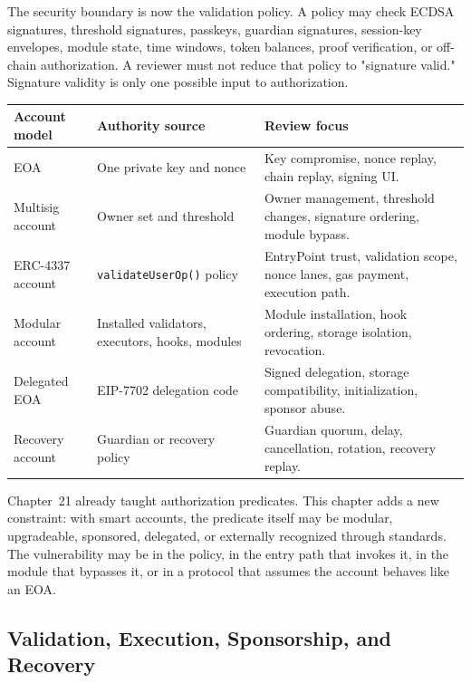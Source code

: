 The security boundary is now the validation policy. A policy may check ECDSA signatures, threshold signatures, passkeys, guardian signatures, session-key envelopes, module state, time windows, token balances, proof verification, or off-chain authorization. A reviewer must not reduce that policy to "signature valid." Signature validity is only one possible input to authorization.

\begin{table}[htbp]
\centering
\small
\renewcommand{\arraystretch}{1.14}
\begin{tabularx}{\textwidth}{@{}>{\RaggedRight\arraybackslash}p{}>{\RaggedRight\arraybackslash}p{}X@{}}
\toprule
Account model & Authority source & Review focus \\
\midrule
EOA & One private key and nonce & Key compromise, nonce replay, chain replay, signing UI. \\
Multisig account & Owner set and threshold & Owner management, threshold changes, signature ordering, module bypass. \\
ERC-4337 account & \texttt{validateUserOp()} policy & EntryPoint trust, validation scope, nonce lanes, gas payment, execution path. \\
Modular account & Installed validators, executors, hooks, modules & Module installation, hook ordering, storage isolation, revocation. \\
Delegated EOA & EIP-7702 delegation code & Signed delegation, storage compatibility, initialization, sponsor abuse. \\
Recovery account & Guardian or recovery policy & Guardian quorum, delay, cancellation, rotation, recovery replay. \\
\bottomrule
\end{tabularx}
\end{table}

Chapter~21 already taught authorization predicates. This chapter adds a new constraint: with smart accounts, the predicate itself may be modular, upgradeable, sponsored, delegated, or externally recognized through standards. The vulnerability may be in the policy, in the entry path that invokes it, in the module that bypasses it, or in a protocol that assumes the account behaves like an EOA.

\subsection{Validation, Execution, Sponsorship, and Recovery}

